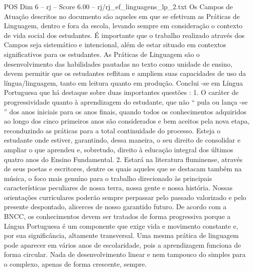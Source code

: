 \begin{textsample}{POS Dim 6 – rj – Score 6.00 – rj/rj\_ef\_linguagens\_lp\_2.txt}
Os Campos de Atuação descritos no documento são aqueles em que se efetivam as Práticas de Linguagem, dentro e fora da escola, levando sempre em consideração o contexto de vida social dos estudantes.
É importante que o trabalho realizado através dos Campos seja sistemático e intencional, além de estar situado em contextos significativos para os estudantes.
As Práticas de Linguagem são o desenvolvimento das habilidades pautadas no texto como unidade de ensino, devem permitir que os estudantes reflitam e ampliem suas capacidades de uso da língua/linguagem, tanto em leitura quanto em produção.
Conclui -se em Língua Portuguesa que há destaque sobre duas importantes questões : 1.
O caráter de progressividade quanto à aprendizagem do estudante, que não “ pula ou lança -se ” dos anos iniciais para os anos finais, quando todos os conhecimentos adquiridos ao longo dos cinco primeiros anos são considerados e bem aceitos pela nova etapa, reconduzindo as práticas para a total continuidade do processo.
Esteja o estudante onde estiver, garantindo, dessa maneira, o seu direito de consolidar e ampliar o que aprendeu e, sobretudo, direito à educação integral dos últimos quatro anos do Ensino Fundamental. 2.
Estará na literatura fluminense, através de seus poetas e escritores, dentre os quais aqueles que se destacam também na música, o foco mais genuíno para o trabalho direcionado às principais características peculiares de nossa terra, nossa gente e nossa história.
Nossas orientações curriculares poderão sempre perpassar pelo passado valorizado e pelo presente despontado, alicerces de nosso garantido futuro.
De acordo com a BNCC, os conhecimentos devem ser tratados de forma progressiva porque a Língua Portuguesa é um componente que exige vida e movimento constante e, por sua significância, altamente transversal.
Uma mesma prática de linguagem pode aparecer em vários anos de escolaridade, pois a aprendizagem funciona de forma circular.
Nada de desenvolvimento linear e nem tampouco do simples para o complexo, apenas de forma crescente, sempre.

\end{textsample}
